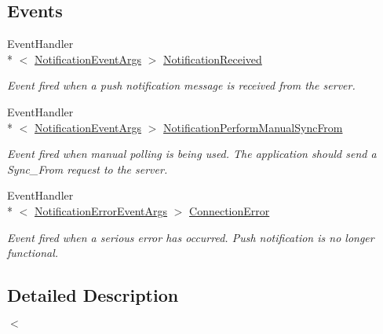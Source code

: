 \subsection*{Events}
\begin{DoxyCompactItemize}
\item 
Event\-Handler\\*
$<$ \hyperlink{class_cloud_api_public_1_1_push_notification_1_1_notification_event_args}{Notification\-Event\-Args} $>$ \hyperlink{class_cloud_api_public_1_1_push_notification_1_1_c_l_notification_a5bafbe473f43db150e6280ca3f2b9f12}{Notification\-Received}
\begin{DoxyCompactList}\small\item\em Event fired when a push notification message is received from the server. \end{DoxyCompactList}\item 
Event\-Handler\\*
$<$ \hyperlink{class_cloud_api_public_1_1_push_notification_1_1_notification_event_args}{Notification\-Event\-Args} $>$ \hyperlink{class_cloud_api_public_1_1_push_notification_1_1_c_l_notification_ac2922d1d48868bd4b3562f3e92d450f7}{Notification\-Perform\-Manual\-Sync\-From}
\begin{DoxyCompactList}\small\item\em Event fired when manual polling is being used. The application should send a Sync\-\_\-\-From request to the server. \end{DoxyCompactList}\item 
Event\-Handler\\*
$<$ \hyperlink{class_cloud_api_public_1_1_push_notification_1_1_notification_error_event_args}{Notification\-Error\-Event\-Args} $>$ \hyperlink{class_cloud_api_public_1_1_push_notification_1_1_c_l_notification_a1fe49d2b1a5f1256ccbf730ceaedf57a}{Connection\-Error}
\begin{DoxyCompactList}\small\item\em Event fired when a serious error has occurred. Push notification is no longer functional. \end{DoxyCompactList}\end{DoxyCompactItemize}


\subsection{Detailed Description}


$<$ 

